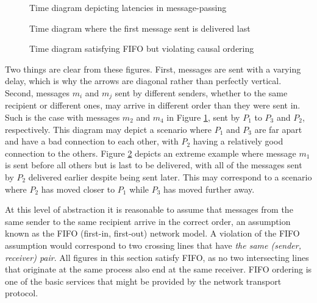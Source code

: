 \documentclass[]             %
{NASA}                       %
\theoremstyle{definition}
\begin{document}
\begin{figure}[p]
  \centering 
  \caption{Time diagram depicting latencies in message-passing}
  \label{fig:message-latencies}
\end{figure}

\begin{figure}[p]
  \centering 
  \caption{Time diagram where the first message sent is delivered
    last}
  \label{fig:message-latencies2}
\end{figure}

\begin{figure}[p]
  \centering 
  \caption{Time diagram satisfying FIFO but violating causal ordering}
  \label{fig:message-latencies3}
\end{figure}

\afterpage{\clearpage}

Two things are clear from these figures. First, messages are sent with
a varying delay, which is why the arrows are diagonal rather than
perfectly vertical. Second, messages $m_i$ and $m_j$ sent by different
senders, whether to the same recipient or different ones, may arrive
in different order than they were sent in. Such is the case with
messages $m_2$ and $m_4$ in Figure \ref{fig:message-latencies}, sent
by $P_1$ to $P_3$ and $P_2$, respectively. This diagram may depict a
scenario where $P_1$ and $P_3$ are far apart and have a bad connection
to each other, with $P_2$ having a relatively good connection to the
others. Figure \ref{fig:message-latencies2} depicts an extreme example
where message $m_1$ is sent before all others but is last to be
delivered, with all of the messages sent by $P_2$ delivered earlier
despite being sent later. This may correspond to a scenario where
$P_2$ has moved closer to $P_1$ while $P_3$ has moved further away.

At this level of abstraction it is reasonable to assume that messages
from the same sender to the same recipient arrive in the correct
order, an assumption known as the FIFO (first-in, first-out) network
model. A violation of the FIFO assumption would correspond to two
crossing lines that have \emph{the same (sender, receiver) pair}. All
figures in this section satisfy FIFO, as no two intersecting lines
that originate at the same process also end at the same receiver. FIFO
ordering is one of the basic services that might be provided by the
network transport protocol.
\end{document}
